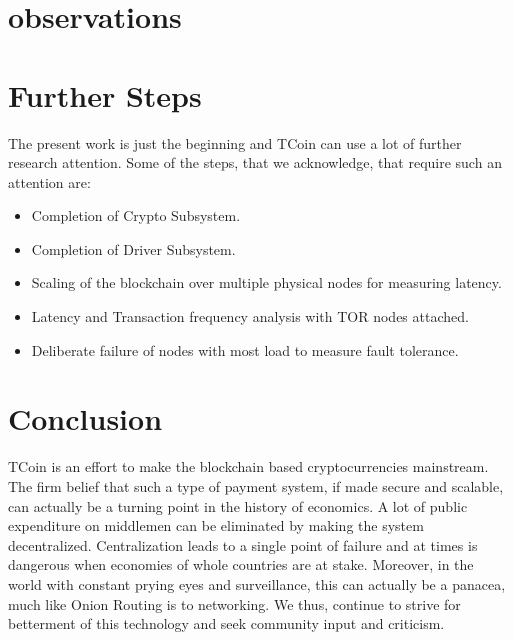 \documentclass[conference,a4paper,12pt]{IEEEtran}
\begin{document}
\section{observations}

\section{Further Steps}
The present work is just the beginning and TCoin can use a lot of further research attention. Some of the steps, that we acknowledge, that require such an attention are:
\begin{itemize}

\item{Completion of Crypto Subsystem.}
\item{Completion of Driver Subsystem.}
\item{Scaling of the blockchain over multiple physical nodes for measuring latency.}
\item{Latency and Transaction frequency analysis with TOR nodes attached.}
\item{Deliberate failure of nodes with most load to measure fault tolerance.}

\end{itemize}

\section{Conclusion}
TCoin is an effort to make the blockchain based cryptocurrencies mainstream. The firm belief that such a type of payment system, if made secure and scalable, can actually be a turning point in the history of economics. A lot of public expenditure on middlemen can be eliminated by making the system decentralized. Centralization leads to a single point of failure and at times is dangerous when economies of whole countries are at stake. Moreover, in the world with constant prying eyes and surveillance, this can actually be a panacea, much like Onion Routing is to networking. We thus, continue to strive for betterment of this technology and seek community input and criticism.

\newpage
 

\end{document}
